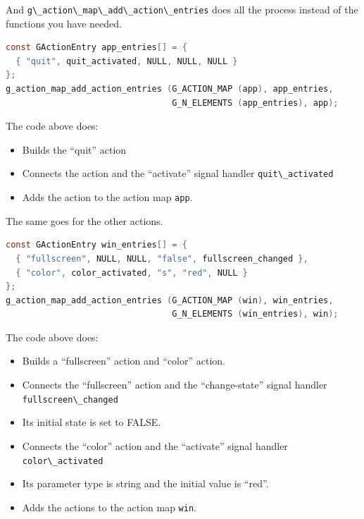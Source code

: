 And \passthrough{\lstinline!g\_action\_map\_add\_action\_entries!} does
all the process instead of the functions you have needed.

\begin{lstlisting}[language=C]
const GActionEntry app_entries[] = {
  { "quit", quit_activated, NULL, NULL, NULL }
};
g_action_map_add_action_entries (G_ACTION_MAP (app), app_entries,
                                 G_N_ELEMENTS (app_entries), app);
\end{lstlisting}

The code above does:

\begin{itemize}
\tightlist
\item
  Builds the ``quit'' action
\item
  Connects the action and the ``activate'' signal handler
  \passthrough{\lstinline!quit\_activated!}
\item
  Adds the action to the action map \passthrough{\lstinline!app!}.
\end{itemize}

The same goes for the other actions.

\begin{lstlisting}[language=C]
const GActionEntry win_entries[] = {
  { "fullscreen", NULL, NULL, "false", fullscreen_changed },
  { "color", color_activated, "s", "red", NULL }
};
g_action_map_add_action_entries (G_ACTION_MAP (win), win_entries,
                                 G_N_ELEMENTS (win_entries), win);
\end{lstlisting}

The code above does:

\begin{itemize}
\tightlist
\item
  Builds a ``fullscreen'' action and ``color'' action.
\item
  Connects the ``fullscreen'' action and the ``change-state'' signal
  handler \passthrough{\lstinline!fullscreen\_changed!}
\item
  Its initial state is set to FALSE.
\item
  Connects the ``color'' action and the ``activate'' signal handler
  \passthrough{\lstinline!color\_activated!}
\item
  Its parameter type is string and the initial value is ``red''.
\item
  Adds the actions to the action map \passthrough{\lstinline!win!}.
\end{itemize}


